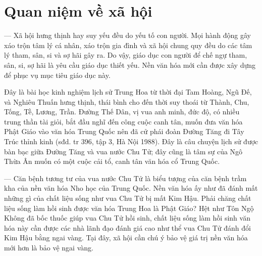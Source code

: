 \section{Quan niệm về xã hội} %
\label{sec:68_69_xa_hoi}

— Xã hội hưng thịnh hay suy yếu đều do yếu tố con người. Mọi hành động gây xáo trộn tâm lý cá nhân, xáo trộn gia đình và xã hội chung quy đều do các tâm lý tham, sân, si và sợ hãi gây ra. Do vậy, giáo dục con người để chế ngự tham, sân, si, sợ hãi là yêu cầu giáo dục thiết yếu. Nền văn hóa mới cần được xây dựng để phục vụ mục tiêu giáo dục này.

Đây là bài học kinh nghiệm lịch sử Trung Hoa từ thời đại Tam Hoàng, Ngũ Đế, và Nghiêu Thuấn hưng thịnh, thái bình cho đến thời suy thoái từ Thành, Chu, Tống, Tề, Lương, Trần. Đường Thế Dân, vị vua anh minh, đức độ, có nhiều trung thần tài giỏi, bắt đầu nghĩ đến công cuộc canh tân, muốn đưa văn hóa Phật Giáo vào văn hóa Trung Quốc nên đã cử phái đoàn Đường Tăng đi Tây Trúc thỉnh kinh (sđd. tr 396, tập 3, Hà Nội 1988). Đây là câu chuyện lịch sử được bàn bạc giữa Đường Tăng và vua nước Chu Tử; đây cũng là tâm sự của Ngô Thừa Ân muốn có một cuộc cải tổ, canh tân văn hóa cổ Trung Quốc.

— Căn bệnh tương tư của vua nước Chu Tử là biểu tượng của căn bệnh trầm kha của nền văn hóa Nho học của Trung Quốc. Nền văn hóa ấy như đã đánh mất những gì của chất liệu sống như vua Chu Tử bị mất Kim Hậu. Phải chăng chất liệu sống làm hồi sinh được văn hóa Trung Hoa là Phật Giáo? Hệt như Tôn Ngộ Không đã bốc thuốc giúp vua Chu Tử hồi sinh, chất liệu sống làm hồi sinh văn hóa này cần được các nhà lãnh đạo đánh giá cao như thể vua Chu Tử đánh đổi Kim Hậu bằng ngai vàng. Tại đây, xã hội cần chú ý bảo vệ giá trị nền văn hóa mới hơn là bảo vệ ngai vàng.

